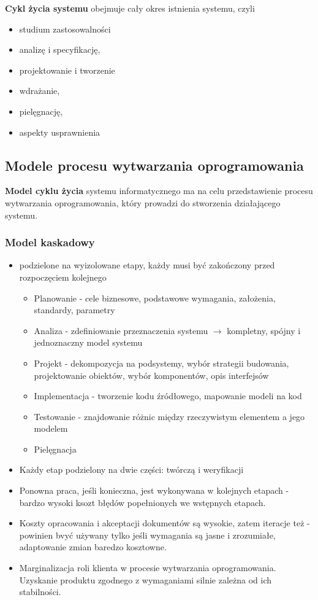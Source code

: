 \documentclass[a4paper]{article}
\begin{document}
\textbf{Cykl życia systemu} obejmuje cały okres istnienia systemu, czyli
    \begin{itemize}
        \item studium zastosowalności
        \item analizę i specyfikację,
        \item projektowanie i tworzenie
        \item wdrażanie,
        \item pielęgnację,
        \item aspekty usprawnienia
    \end{itemize}

\subsection{Modele procesu wytwarzania oprogramowania}
\textbf{Model cyklu życia} systemu informatycznego ma na celu przedstawienie procesu wytwarzania
    oprogramowania, który prowadzi do stworzenia działającego systemu.


\subsubsection{Model kaskadowy}
\begin{itemize}
    \item podzielone na wyizolowane etapy, każdy musi być zakończony przed rozpoczęciem kolejnego
    \begin{itemize}
        \item Planowanie - cele biznesowe, podstawowe wymagania, założenia, standardy, parametry
        \item Analiza - zdefiniowanie przeznaczenia systemu $\rightarrow$ kompletny, spójny i jednoznaczny model systemu
        \item Projekt - dekompozycja na podsystemy, wybór strategii budowania, projektowanie obiektów, wybór komponentów, opis interfejsów
        \item Implementacja - tworzenie kodu źródłowego, mapowanie modeli na kod
        \item Testowanie - znajdowanie różnic między rzeczywistym elementem a jego modelem
        \item Pielęgnacja
    \end{itemize}
    \item Każdy etap podzielony na dwie części: twórczą i weryfikacji
    \item Ponowna praca, jeśli konieczna, jest wykonywana w kolejnych etapach - bardzo wysoki ksozt błędów
    popełnionych we wstępnych etapach.
    \item Koszty opracowania i akceptacji dokumentów są wysokie, zatem iteracje też - powinien bvyć używany
    tylko jeśli wymagania są jasne i zrozumiałe, adaptowanie zmian baredzo kosztowne.
    \item Marginalizacja roli klienta w procesie wytwarzania oprogramowania. Uzyskanie produktu zgodnego z wymaganiami
    silnie zależna od ich stabilności.
\end{itemize}
\end{document}
